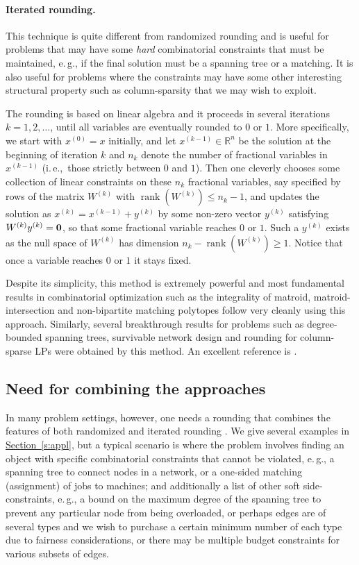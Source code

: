 \documentclass[11pt]{article}
\newcommand{\rank}{\operatorname{rank}}
\theoremstyle{definition}
\newcommand{\expref}[2]{\texorpdfstring{\hyperref[#2]{#1~\ref{#2}}}{#1~\ref{#2}}}
\newcommand{\R}{{\mathbb R}}
\newcommand{\ie}{i.\,e.}
\newcommand{\eg}{e.\,g.}
\begin{document}
\paragraph{Iterated rounding.} This technique is quite different from randomized rounding and is useful for problems that may have  some \emph{hard} combinatorial constraints that must be maintained, \eg, if the final solution must be a spanning tree or a matching. It is also useful for problems where the constraints may have some other interesting structural property such as column-sparsity that we may wish to exploit.

The rounding is based on linear algebra and it proceeds in several iterations $k=1,2,\ldots$, until
all variables are eventually rounded to $0$ or $1$. More specifically, we start with $x^{(0)}=x$ initially, and let $x^{(k-1)} \in \R^n$ be the
solution at the beginning
of iteration $k$ and $n_k$ denote the number
of fractional variables in $x^{(k-1)}$  (\ie,~those strictly between $0$ and $1$).
Then one cleverly chooses some collection of linear constraints on these $n_k$ fractional variables, say specified by rows of the
matrix $W^{(k)}$ with 
$\rank(W^{(k)}) \leq n_k-1$, and updates the solution as $x^{(k)} = x^{(k-1)} + y^{(k)}$ by some non-zero vector $y^{(k)}$ satisfying $W^{(k)} y^{(k)}=\bf{0}$,
so that some
fractional variable reaches $0$ or $1$. Such a $y^{(k)}$ exists as the null space of $W^{(k)}$ has dimension $n_k - \rank(W^{(k)}) \geq 1$.
Notice that once a variable reaches $0$ or $1$ it stays fixed.

Despite its simplicity, this method is extremely powerful and
most fundamental results in combinatorial optimization
such as the integrality of matroid, matroid-intersection and non-bipartite
matching polytopes follow very cleanly using this approach.
Similarly, several breakthrough results for problems such
as degree-bounded spanning trees, survivable network design
and rounding for column-sparse LPs
were obtained by this method. An excellent reference is \cite{Lau-book}.


\subsection{Need for combining the approaches}
In many problem settings, %
 however, one needs a rounding that combines the features of both randomized and iterated rounding \cite{CVZ10,CVZ11,GKPS06, AGMOS10}. We give several examples in
\expref{Section}{s:appl}, but a typical scenario is where
the problem involves finding an object with specific combinatorial constraints that cannot be violated, \eg, a spanning tree to connect nodes in a network, or a one-sided matching (assignment) of jobs to machines; and additionally a list of other soft side-constraints, \eg, a bound on the maximum degree of the spanning tree to prevent any particular node from being overloaded, or perhaps edges are of several types and we wish to purchase a certain minimum number of each type due to fairness considerations, or there may be multiple budget constraints for various subsets of edges. %
%
\end{document}
